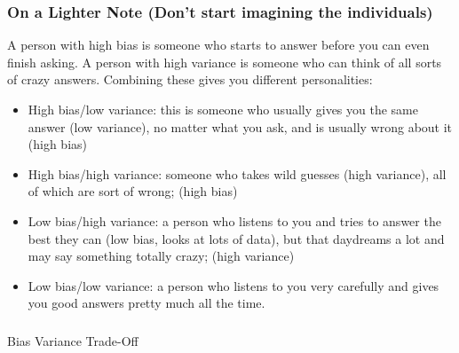 







\begin{frame}[fragile]\frametitle{On a Lighter Note (Don't start imagining the individuals)}
A person with high bias is someone who starts to answer before you can even finish asking. A person with high variance is someone who can think of all sorts of crazy answers. Combining these gives you different personalities:
\begin{itemize}
\item High bias/low variance: this is someone who usually gives you the same answer (low variance), no matter what you ask, and is usually wrong about it (high bias)

\item High bias/high variance: someone who takes wild guesses (high variance), all of which are sort of wrong; (high bias)

\item Low bias/high variance: a person who listens to you and tries to answer the best they can (low bias, looks at lots of data), but that daydreams a lot and may say something totally crazy; (high variance)

\item Low bias/low variance: a person who listens to you very carefully and gives you good answers pretty much all the time.
\end{itemize}
\end{frame}

\begin{frame}[fragile]\frametitle{}
\begin{center}
{\Large Bias Variance Trade-Off}
\end{center}
\end{frame}

